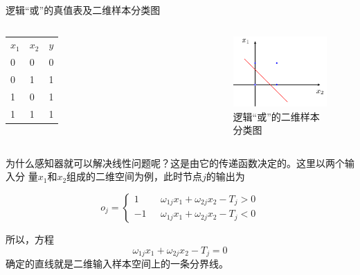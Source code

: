 \documentclass[xcolor=svgnames]{beamer}
\begin{document}
\begin{frame}{逻辑``或''的真值表及二维样本分类图}
  \begin{columns}
    \begin{table}
      \centering
      \begin{tabular}[b]  {lll}
	$x_1$ & $x_2$ & $y$ \\
	0 & 0 & 0\\
	0 & 1 & 1\\
	1 & 0 & 1\\
	1 & 1 & 1\\
      \end{tabular}
    \end{table}
    \begin{figure}
      \centering
      \includegraphics[width=\textwidth]{fig33.pdf}
      \caption{逻辑``或''的二维样本分类图}
      \label{fig:logicor}
    \end{figure}
  \end{columns}
\end{frame}

\begin{frame}
  为什么感知器就可以解决线性问题呢？这是由它的\alert{传递函数}决定的。这里以两个输入分
  量\(x_1\)和\(x_2\)组成的二维空间为例，此时节点\(j\)的输出为
  
  \[ o_j=\left \{ \begin{aligned} 1 & ~~~\omega_{1j}x_1+\omega_{2j}x_2-T_j>0 \\
      -1 & ~~~\omega_{1j}x_1+\omega _{2j}x_2-T_j<0 \end{aligned} \right. \]
  
  所以，方程
  \begin{equation}
    \label{eq:linear}
    \omega_{1j}x_1+\omega_{2j}x_2-T_j=0
  \end{equation}
  确定的直线就是二维输入样本空间上的一条分界线。
\end{frame}
\end{document}
